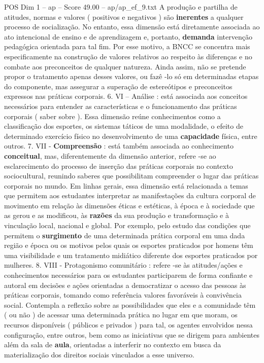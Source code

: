 \begin{textsample}{POS Dim 1 – ap – Score 49.00 – ap/ap\_ef\_9.txt}
A produção e partilha de atitudes, normas e valores ( positivos e negativos ) são \textbf{inerentes} a qualquer processo de socialização.
No entanto, essa dimensão está diretamente associada ao ato intencional de ensino e de aprendizagem e, portanto, \textbf{demanda} intervenção pedagógica orientada para tal fim.
Por esse motivo, a BNCC se concentra mais especificamente na construção de valores relativos ao respeito às diferenças e no combate aos preconceitos de qualquer natureza.
Ainda assim, não se pretende propor o tratamento apenas desses valores, ou fazê -lo só em determinadas etapas do componente, mas assegurar a superação de estereótipos e preconceitos expressos nas práticas corporais. 6.
VI – Análise : está associada aos conceitos necessários para entender as características e o funcionamento das práticas corporais ( saber sobre ).
Essa dimensão reúne conhecimentos como a classificação dos esportes, os sistemas táticos de uma modalidade, o efeito de determinado exercício físico no desenvolvimento de uma \textbf{capacidade} física, entre outros. 7.
VII - \textbf{Compreensão} : está também associada ao conhecimento \textbf{conceitual}, mas, diferentemente da dimensão anterior, refere -se ao esclarecimento do processo de inserção das práticas corporais no contexto sociocultural, reunindo saberes que possibilitam compreender o lugar das práticas corporais no mundo.
Em linhas gerais, essa dimensão está relacionada a temas que permitem aos estudantes interpretar as manifestações da cultura corporal de movimento em relação às dimensões éticas e estéticas, à época e à sociedade que as gerou e as modificou, às \textbf{razões} da sua produção e transformação e à vinculação local, nacional e global.
Por exemplo, pelo estudo das condições que permitem o \textbf{surgimento} de uma determinada prática corporal em uma dada região e época ou os motivos pelos quais os esportes praticados por homens têm uma visibilidade e um tratamento midiático diferente dos esportes praticados por mulheres. 8.
VIII - Protagonismo comunitário : refere -se às atitudes/ações e conhecimentos necessários para os estudantes participarem de forma confiante e autoral em decisões e ações orientadas a democratizar o acesso das pessoas às práticas corporais, tomando como referência valores favoráveis à convivência social.
Contempla a reflexão sobre as possibilidades que eles e a comunidade têm ( ou não ) de acessar uma determinada prática no lugar em que moram, os recursos disponíveis ( públicos e privados ) para tal, os agentes envolvidos nessa configuração, entre outros, bem como as iniciativas que se dirigem para ambientes além da sala de \textbf{aula}, orientadas a interferir no contexto em busca da materialização dos direitos sociais vinculados a esse universo.

\end{textsample}
